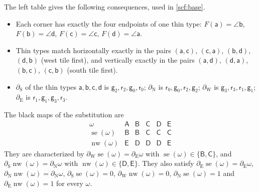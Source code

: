 The left table gives the following consequences, used in \cref{scf:base}.
\begin{itemize}
\item Each corner has exactly the four endpoints of one thin type: $F(\mathsf a)=\angle\mathsf b$, $F(\mathsf b)=\angle\mathsf d$, $F(\mathsf c)=\angle\mathsf c$, $F(\mathsf d)=\angle\mathsf a$.
\item Thin types match horizontally exactly in the pairs $(\mathsf a,\mathsf c)$, $(\mathsf c,\mathsf a)$, $(\mathsf b,\mathsf d)$, $(\mathsf d,\mathsf b)$ (west tile first), and vertically exactly in the pairs $(\mathsf a,\mathsf d)$, $(\mathsf d,\mathsf a)$, $(\mathsf b,\mathsf c)$, $(\mathsf c,\mathsf b)$ (south tile first).
\item $\partial_{\mathrm S}$ of the thin types $\mathsf a,\mathsf b,\mathsf c,\mathsf d$ is $\mathsf g_2,\mathsf r_2,\mathsf g_0,\mathsf r_0$; $\partial_{\mathrm N}$ is $\mathsf r_0,\mathsf g_0,\mathsf r_2,\mathsf g_2$; $\partial_{\mathrm W}$ is $\mathsf g_3,\mathsf r_3,\mathsf r_1,\mathsf g_1$; $\partial_{\mathrm E}$ is $\mathsf r_1,\mathsf g_1,\mathsf g_3,\mathsf r_3$.
\end{itemize}
The black maps of the substitution are
\[
\begin{array}{c|ccccc}
\omega & \mathsf A&\mathsf B&\mathsf C&\mathsf D&\mathsf E\\\hline
\operatorname{se}(\omega)&\mathsf B&\mathsf B&\mathsf C&\mathsf C&\mathsf C\\
\operatorname{nw}(\omega)&\mathsf E&\mathsf D&\mathsf D&\mathsf D&\mathsf E
\end{array}
\]
They are characterized by $\partial_{\mathrm W}\operatorname{se}(\omega)=\partial_{\mathrm E}\omega$ with $\operatorname{se}(\omega)\in\{\mathsf B,\mathsf C\}$, and $\partial_{\mathrm S}\operatorname{nw}(\omega)=\partial_{\mathrm N}\omega$ with $\operatorname{nw}(\omega)\in\{\mathsf D,\mathsf E\}$. They also satisfy $\partial_{\mathrm E}\operatorname{se}(\omega)=\partial_{\mathrm E}\omega$, $\partial_{\mathrm N}\operatorname{nw}(\omega)=\partial_{\mathrm N}\omega$, $\partial_{\mathrm S}\operatorname{se}(\omega)=0$, $\partial_{\mathrm W}\operatorname{nw}(\omega)=0$, $\partial_{\mathrm N}\operatorname{se}(\omega)=1$ and $\partial_{\mathrm E}\operatorname{nw}(\omega)=1$ for every $\omega$.

